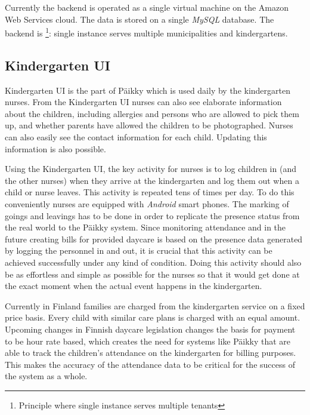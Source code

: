 Currently the backend is operated as a single virtual machine on the Amazon Web Services cloud. The data is stored on a single \textit{MySQL} database. The backend is \footnote{Principle where single instance serves multiple tenants}: single instance serves multiple municipalities and kindergartens. 






\subsection{Kindergarten UI}

Kindergarten UI is the part of Päikky which is used daily by the kindergarten nurses. From the Kindergarten UI nurses can also see elaborate information about the children, including allergies and persons who are allowed to pick them up, and whether parents have allowed the children to be photographed. Nurses can also easily see the contact information for each child. Updating this information is also possible. %

Using the Kindergarten UI, the key activity for nurses is to log children in (and the other nurses) when they arrive at the kindergarten and log them out when a child or nurse leaves. This activity is repeated tens of times per day. To do this conveniently nurses are equipped with \textit{Android} smart phones. The marking of goings and leavings has to be done in order to replicate the presence status from the real world to the Päikky system. Since monitoring attendance and in the future creating bills for provided daycare is based on the presence data generated by logging the personnel in and out, it is crucial that this activity can be achieved successfully under any kind of condition. Doing this activity should also be as effortless and simple as possible for the nurses so that it would get done at the exact moment when the actual event happens in the kindergarten. 

Currently in Finland families are charged from the kindergarten service on a fixed price basis. Every child with similar care plans is charged with an equal amount. Upcoming changes in Finnish daycare legislation changes the basis for payment to be hour rate based, which creates the need for systems like Päikky that are able to track the children's attendance on the kindergarten for billing purposes. This makes the accuracy of the attendance data to be critical for the success of the system as a whole. %

